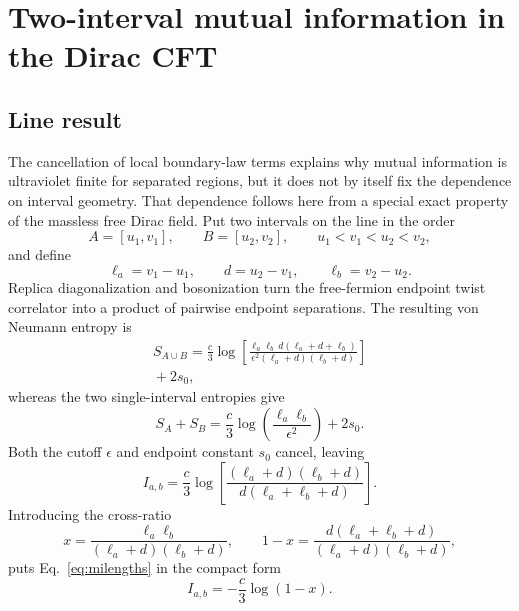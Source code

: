 \documentclass[aps,prb,twocolumn,nofootinbib,superscriptaddress,floatfix]{revtex4-2}
\newcommand{\Iab}{I_{a,b}}
\begin{document}
\section{Two-interval mutual information in the Dirac CFT}
\label{sec:cft}

\subsection{Line result}

The cancellation of local boundary-law terms explains why mutual information
is ultraviolet finite for separated regions, but it does not by itself fix
the dependence on interval geometry.  That dependence follows here from a
special exact property of the massless free Dirac field.  Put two intervals
on the line in the order
\begin{equation}
 A=[u_1,v_1],\qquad B=[u_2,v_2],
 \qquad u_1<v_1<u_2<v_2,
\end{equation}
and define
\begin{equation}
 \ell_a=v_1-u_1,\qquad d=u_2-v_1,\qquad
 \ell_b=v_2-u_2.
\end{equation}
Replica diagonalization and bosonization turn the free-fermion endpoint twist
correlator into a product of pairwise endpoint separations.  The resulting
von Neumann entropy is \cite{CasiniHuerta2009}
\begin{multline}
 S_{A\cup B}=\frac{c}{3}\log\left[
 \frac{\ell_a\ell_b\,d(\ell_a+d+\ell_b)}
 {\epsilon^2(\ell_a+d)(\ell_b+d)}\right]
 \\
 {}+2s_0,
 \label{eq:twointervalentropy}
\end{multline}
whereas the two single-interval entropies give
\begin{equation}
 S_A+S_B=\frac{c}{3}\log\left(
 \frac{\ell_a\ell_b}{\epsilon^2}\right)+2s_0.
\end{equation}
Both the cutoff $\epsilon$ and endpoint constant $s_0$ cancel, leaving
\begin{equation}
 \Iab=\frac{c}{3}\log\left[
 \frac{(\ell_a+d)(\ell_b+d)}
 {d(\ell_a+\ell_b+d)}\right].
 \label{eq:milengths}
\end{equation}
Introducing the cross-ratio
\begin{equation}
 x=\frac{\ell_a\ell_b}{(\ell_a+d)(\ell_b+d)},
 \qquad
 1-x=\frac{d(\ell_a+\ell_b+d)}
 { (\ell_a+d)(\ell_b+d)},
\end{equation}
puts Eq.~\eqref{eq:milengths} in the compact form
\begin{equation}
 \boxed{\Iab=-\frac{c}{3}\log(1-x)}.
 \label{eq:mifreefermion}
\end{equation}
\end{document}
